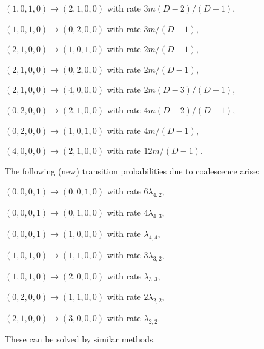 \documentclass[rmp]{revtex4}
\begin{document}
$(1,0,1,0) \to (2,1,0,0)$ with rate $3m(D-2)/(D-1)$,

$(1,0,1,0) \to (0,2,0,0)$ with rate $3m/(D-1)$,

$(2,1,0,0) \to (1,0,1,0)$ with rate $2m/(D-1)$,

$(2,1,0,0) \to (0,2,0,0)$ with rate $2m/(D-1)$,

$(2,1,0,0) \to (4,0,0,0)$ with rate $2m(D-3)/(D-1)$,

$(0,2,0,0) \to (2,1,0,0)$ with rate $4m(D-2)/(D-1)$,

$(0,2,0,0) \to (1,0,1,0)$ with rate $4m/(D-1)$,

$(4,0,0,0) \to (2,1,0,0)$ with rate $12m/(D-1)$.

The following (new) transition probabilities due to coalescence arise:

$(0,0,0,1) \to (0,0,1,0)$ with rate $6\lambda_{4,2}$,

$(0,0,0,1) \to (0,1,0,0)$ with rate $4\lambda_{4,3}$,

$(0,0,0,1) \to (1,0,0,0)$ with rate $\lambda_{4,4}$,

$(1,0,1,0) \to (1,1,0,0)$ with rate $3\lambda_{3,2}$,

$(1,0,1,0) \to (2,0,0,0)$ with rate $\lambda_{3,3}$,

$(0,2,0,0) \to (1,1,0,0)$ with rate $2\lambda_{2,2}$,

$(2,1,0,0) \to (3,0,0,0)$ with rate $\lambda_{2,2}$.

These can be solved by similar methods.
\end{document}
